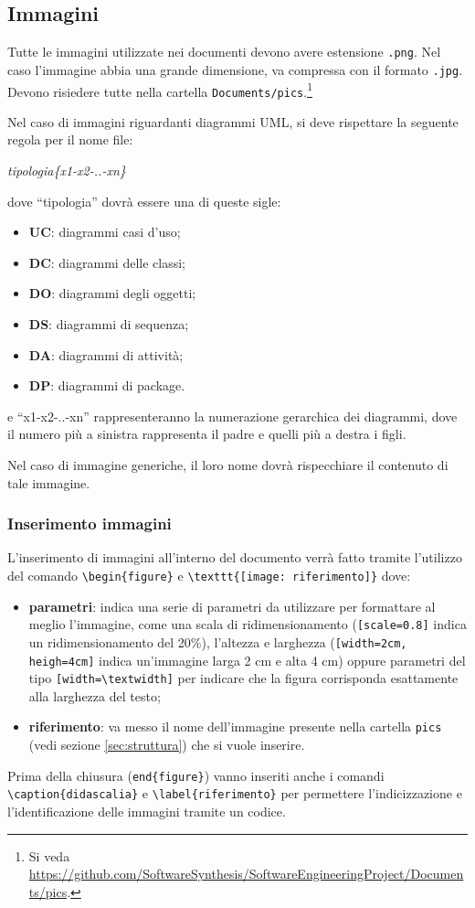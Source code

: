 \subsection{Immagini}\label{image}
Tutte le immagini utilizzate nei documenti devono avere estensione \verb+.png+. Nel caso l'immagine abbia una grande dimensione, va compressa con il formato \verb+.jpg+. Devono risiedere tutte nella cartella \verb+Documents/pics+.\footnote{%
Si veda \url{https://github.com/SoftwareSynthesis/SoftwareEngineeringProject/Documents/pics}.
}

Nel caso di immagini riguardanti diagrammi UML, si deve rispettare la seguente regola per il nome file:
\begin{center}
\textit{tipologia\{x1-x2-..-xn\}}
\end{center}
dove ``tipologia'' dovrà essere una di queste sigle:
\begin{itemize}
\item \textbf{UC}: diagrammi casi d'uso;
\item \textbf{DC}: diagrammi delle classi;
\item \textbf{DO}: diagrammi degli oggetti;
\item \textbf{DS}: diagrammi di sequenza;
\item \textbf{DA}: diagrammi di attività;
\item \textbf{DP}: diagrammi di package.
\end{itemize}
e ``x1-x2-..-xn'' rappresenteranno la numerazione gerarchica dei diagrammi, dove il numero più a sinistra rappresenta il padre e quelli più a destra i figli.

Nel caso di immagine generiche, il loro nome dovrà rispecchiare il contenuto di tale immagine.

\subsubsection{Inserimento immagini}
L'inserimento di immagini all'interno del documento verrà fatto tramite l'utilizzo del comando \verb+\begin{figure}+ e \verb+\texttt{[image: riferimento]}+ dove:
\begin{itemize}
\item \textbf{parametri}: indica una serie di parametri da utilizzare per formattare al meglio l'immagine, come una scala di ridimensionamento (\verb+[scale=0.8]+ indica un ridimensionamento del 20\%), l'altezza e larghezza (\verb+[width=2cm, heigh=4cm]+ indica un'immagine larga 2 cm e alta 4 cm) oppure parametri del tipo \verb+[width=\textwidth]+ per indicare che la figura corrisponda esattamente alla larghezza del testo;
\item \textbf{riferimento}: va messo il nome dell'immagine presente nella cartella \verb+pics+ (vedi sezione \ref{sec:struttura}) che si vuole inserire.
\end{itemize}
Prima della chiusura (\verb+end{figure}+) vanno inseriti anche i comandi \verb+\caption{didascalia}+ e \verb+\label{riferimento}+ per permettere l'indicizzazione e l'identificazione delle immagini tramite un codice.

